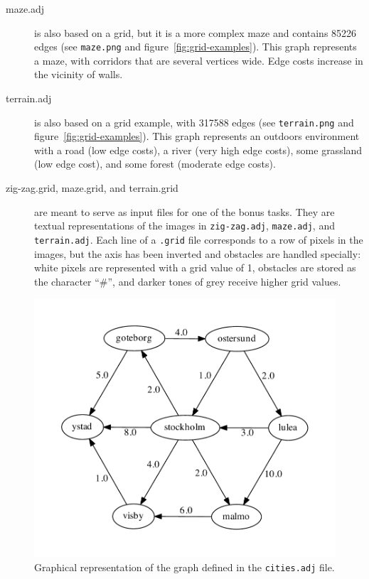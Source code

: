 \documentclass[a4paper,10pt]{article}
\begin{document}
\begin{description}
\item[maze.adj]
  is also based on a grid, but it is a more complex maze and contains 85226 edges (see \texttt{maze.png} and figure~\ref{fig:grid-examples}).
  This graph represents a maze, with corridors that are several vertices wide.
  Edge costs increase in the vicinity of walls.

\item[terrain.adj]
  is also based on a grid example, with 317588 edges (see \texttt{terrain.png} and figure~\ref{fig:grid-examples}).
  This graph represents an outdoors environment with a road (low edge costs), a river (very high edge costs), some grassland (low edge cost), and some forest (moderate edge costs).
  
\item[zig-zag.grid, maze.grid, and terrain.grid]
  are meant to serve as input files for one of the bonus tasks.
  They are textual representations of the images in \texttt{zig-zag.adj}, \texttt{maze.adj}, and \texttt{terrain.adj}.
  Each line of a \texttt{.grid} file corresponds to a row of pixels in the images, but the axis has been inverted and obstacles are handled specially:
  white pixels are represented with a grid value of 1, obstacles are stored as the character ``\#'', and darker tones of grey receive higher grid values.
  
\end{description}

\begin{figure}
  \centering
  \includegraphics[width=0.6\columnwidth]{cities.pdf}
  \caption{
    Graphical representation of the graph defined in the \texttt{cities.adj} file.
  }\label{fig:cities}
\end{figure}
\end{document}
